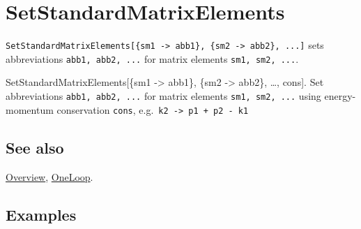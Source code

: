\documentclass[../FeynCalcManual.tex]{subfiles}
\begin{document}
\hypertarget{setstandardmatrixelements}{%
\section{SetStandardMatrixElements}\label{setstandardmatrixelements}}

\texttt{SetStandardMatrixElements[\allowbreak{}\{\allowbreak{}sm1 -> abb1\},\ \allowbreak{}\{\allowbreak{}sm2 -> abb2\},\ \allowbreak{}...]}
sets abbreviations \texttt{abb1,\ \allowbreak{}abb2,\ \allowbreak{}...}
for matrix elements \texttt{sm1,\ \allowbreak{}sm2,\ \allowbreak{}...}.

SetStandardMatrixElements{[}\{sm1 -\textgreater{} abb1\}, \{sm2
-\textgreater{} abb2\}, \ldots, cons{]}. Set abbreviations
\texttt{abb1,\ \allowbreak{}abb2,\ \allowbreak{}...} for matrix elements
\texttt{sm1,\ \allowbreak{}sm2,\ \allowbreak{}...} using energy-momentum
conservation \texttt{cons}, e.g.~\texttt{k2 -> p1 + p2 - k1}

\subsection{See also}

\hyperlink{toc}{Overview}, \hyperlink{oneloop}{OneLoop}.

\subsection{Examples}
\end{document}
